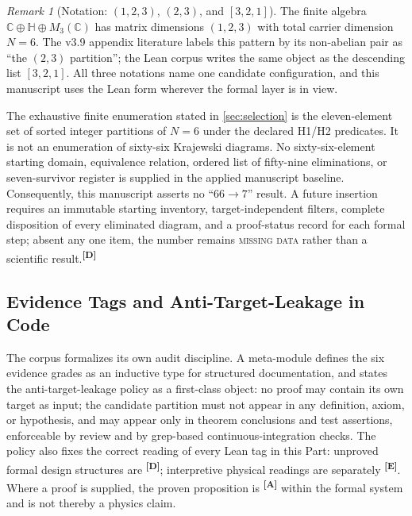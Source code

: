 \documentclass[12pt,a4paper,twoside]{article}
\theoremstyle{plain}
\theoremstyle{definition}
\theoremstyle{remark}
\newtheorem{remark}[theorem]{Remark}
\newcommand{\catmark}[1]{\textsuperscript{\textsf{\textbf{[#1]}}}}
\begin{document}
\begin{remark}[{Notation: $(1,2,3)$, $(2,3)$, and $[3,2,1]$}]
\label{rem:partition-notation}
The finite algebra $\mathbb C \oplus \mathbb H \oplus M_3(\mathbb C)$ has
matrix dimensions $(1,2,3)$ with total carrier dimension $N = 6$. The
v3.9 appendix literature labels this pattern by its non-abelian pair as
``the $(2,3)$ partition''; the Lean corpus writes the same object as the
descending list $[3,2,1]$. All three notations name one candidate
configuration, and this manuscript uses the Lean form wherever the formal layer
is in view.
\end{remark}

\begin{governancebox}
The exhaustive finite enumeration stated in \cref{sec:selection} is the
eleven-element set of sorted integer partitions of $N=6$ under the
declared H1/H2 predicates. It is not an enumeration of sixty-six
Krajewski diagrams. No sixty-six-element starting domain, equivalence
relation, ordered list of fifty-nine eliminations, or seven-survivor
register is supplied in the applied manuscript baseline. Consequently,
this manuscript asserts no ``$66\to7$'' result. A future insertion requires an
immutable starting inventory, target-independent filters, complete
disposition of every eliminated diagram, and a proof-status record for
each formal step; absent any one item, the number remains
\textsc{missing data} rather than a scientific result.\catmark{D}
\end{governancebox}

\subsection{Evidence Tags and Anti-Target-Leakage in Code}
\label{subsec:code-evidence}

The corpus formalizes its own audit discipline. A meta-module defines the
six evidence grades as an inductive type for structured documentation, and
states the anti-target-leakage policy as a first-class object: no proof
may contain its own target as input; the candidate partition must not
appear in any definition, axiom, or hypothesis, and may appear only in
theorem conclusions and test assertions, enforceable by review and by
grep-based continuous-integration checks. The policy also fixes the correct reading of every Lean tag in this Part:
unproved formal design structures are \catmark{D}; interpretive physical
readings are separately \catmark{E}. Where a proof is supplied, the proven
proposition is \catmark{A} within the formal system and is not thereby a
physics claim.
\end{document}
